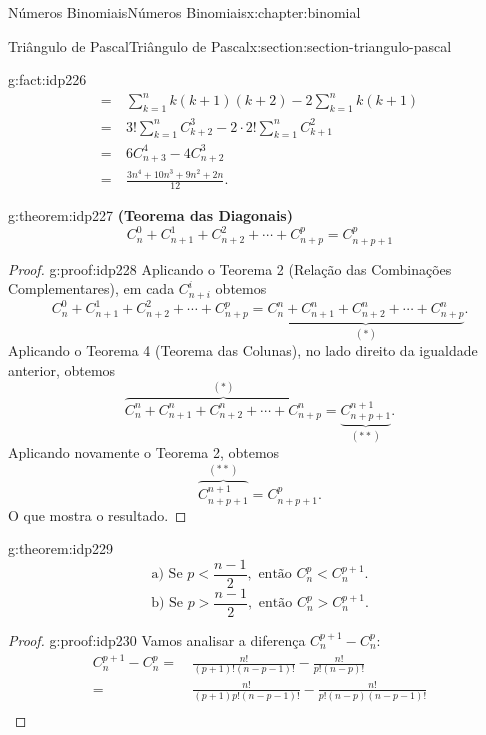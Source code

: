 \documentclass[oneside,10pt,]{book}
\newcommand{\terminology}[1]{\textbf{#1}}
\numberwithin{equation}{section}
\newcommand{\lt}{<}
\newcommand{\amp}{&}
\begin{document}
\begin{chapterptx}{Números Binomiais}{}{Números Binomiais}{}{}{x:chapter:binomial}
\begin{sectionptx}{Triângulo de Pascal}{}{Triângulo de Pascal}{}{}{x:section:section-triangulo-pascal}
\begin{fact}{}{}{g:fact:idp226}
\begin{align*}
= \amp ~ \sum_{k=1}^{n} k(k+1)(k+2) - 2 \sum_{k=1}^{n} k(k+1)  \\
= \amp ~ 3!\sum_{k=1}^{n} C_{k+2}^3 - 2\cdot 2! \sum_{k=1}^{n} C_{k+1}^2  \\
= \amp ~ 6C_{n+3}^4 - 4C_{n+2}^3  \\
= \amp ~ \frac{3n^4+10n^3+9n^2+2n}{12}.  
\end{align*}
\end{fact}
\begin{theorem}{}{}{g:theorem:idp227}%
\terminology{(Teorema das Diagonais)}%
\begin{equation*}
C_n^0 + C_{n+1}^1 + C_{n+2}^2 + \cdots + C_{n+p}^p = C_{n+p+1}^p
\end{equation*}
\end{theorem}
\begin{proof}{}{g:proof:idp228}
Aplicando o Teorema 2 (Relação das Combinações Complementares), em cada \(C_{n+i}^i\) obtemos%
\begin{equation*}
C_n^0 + C_{n+1}^1 + C_{n+2}^2 + \cdots + C_{n+p}^p = \underbrace{C_{n}^n+C_{n+1}^n+C_{n+2}^n+\cdots+C_{n+p}^n}_{(*)}. 
\end{equation*}
Aplicando o Teorema 4 (Teorema das Colunas), no lado direito da igualdade anterior, obtemos%
\begin{equation*}
\overbrace{C_{n}^n+C_{n+1}^n+C_{n+2}^n+\cdots+C_{n+p}^n}^{(*)} = \underbrace{C_{n+p+1}^{n+1}}_{(**)}.
\end{equation*}
Aplicando novamente o Teorema 2, obtemos%
\begin{equation*}
\overbrace{C_{n+p+1}^{n+1}}^{(**)} =  C_{n+p+1}^{p}. 
\end{equation*}
O que mostra o resultado.%
\end{proof}
\begin{theorem}{}{}{g:theorem:idp229}%
%
\begin{equation*}
\text{a) Se } p\lt \frac{n-1}{2}, \text{ então }  C_n^p\lt C_n^{p+1}. 
\end{equation*}
%
\begin{equation*}
\text{b) Se } p> \frac{n-1}{2}, \text{ então }  C_n^p>C_n^{p+1}. 
\end{equation*}
\end{theorem}
\begin{proof}{}{g:proof:idp230}
Vamos analisar a diferença \(C_n^{p+1}-C_n^p\):%
\begin{align*}
C_n^{p+1}-C_n^p = \amp ~ \frac{n!}{(p+1)!(n-p-1)!} - \frac{n!}{p!(n-p)!}  \\
= \amp ~ \frac{n!}{(p+1) p!(n-p-1)!} - \frac{n!}{p!(n-p)(n-p-1)!}  \\

\end{align*}
\end{proof}
\end{sectionptx}
\end{chapterptx}
\end{document}
